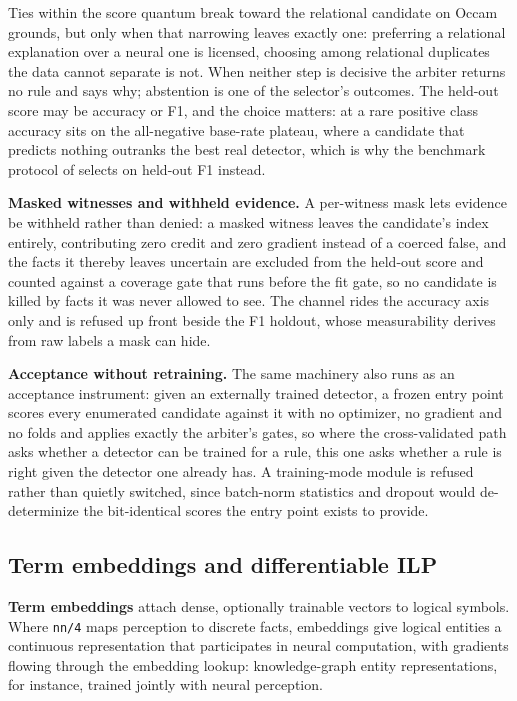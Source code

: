 Ties within the score quantum break toward the relational candidate on Occam grounds, but only when that narrowing leaves exactly one: preferring a relational explanation over a neural one is licensed, choosing among relational duplicates the data cannot separate is not. When neither step is decisive the arbiter returns no rule and says why; abstention is one of the selector's outcomes. The held-out score may be accuracy or F1, and the choice matters: at a rare positive class accuracy sits on the all-negative base-rate plateau, where a candidate that predicts nothing outranks the best real detector, which is why the benchmark protocol of  selects on held-out F1 instead.

\textbf{Masked witnesses and withheld evidence.} A per-witness mask lets evidence be withheld rather than denied: a masked witness leaves the candidate's index entirely, contributing zero credit and zero gradient instead of a coerced false, and the facts it thereby leaves uncertain are excluded from the held-out score and counted against a coverage gate that runs before the fit gate, so no candidate is killed by facts it was never allowed to see. The channel rides the accuracy axis only and is refused up front beside the F1 holdout, whose measurability derives from raw labels a mask can hide.

\textbf{Acceptance without retraining.} The same machinery also runs as an acceptance instrument: given an externally trained detector, a frozen entry point scores every enumerated candidate against it with no optimizer, no gradient and no folds and applies exactly the arbiter's gates, so where the cross-validated path asks whether a detector can be trained for a rule, this one asks whether a rule is right given the detector one already has. A training-mode module is refused rather than quietly switched, since batch-norm statistics and dropout would de-determinize the bit-identical scores the entry point exists to provide.

\subsection{Term embeddings and differentiable ILP}

\textbf{Term embeddings} attach dense, optionally trainable vectors to logical symbols. Where \texttt{nn/4} maps perception to discrete facts, embeddings give logical entities a continuous representation that participates in neural computation, with gradients flowing through the embedding lookup: knowledge-graph entity representations, for instance, trained jointly with neural perception.

